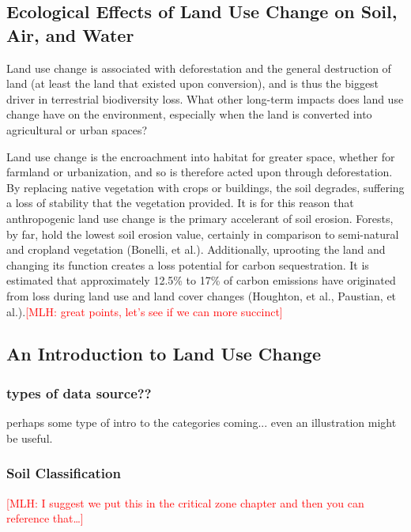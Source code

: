 \documentclass{book}\usepackage{knitr}
\newcommand{\red}[1]{\textcolor{red}{[MLH: #1]}}
\begin{document}
\begin{knitrout}
\begin{kframe}
\section{Ecological Effects of Land Use Change on Soil, Air, and Water}

Land use change is associated with deforestation and the general destruction of land (at least the land that existed upon conversion), and is thus the biggest driver in terrestrial biodiversity loss. What other long-term impacts does land use change have on the environment, especially when the land is converted into agricultural or urban spaces?

Land use change is the encroachment into habitat for greater space, whether for farmland or urbanization, and so is therefore acted upon through deforestation. By replacing native vegetation with crops or buildings, the soil degrades, suffering a loss of stability that the vegetation provided. It is for this reason that anthropogenic land use change is the primary accelerant of soil erosion. Forests, by far, hold the lowest soil erosion value, certainly in comparison to semi-natural and cropland vegetation (Bonelli, et al.). Additionally, uprooting the land and changing its function creates  a loss potential for carbon sequestration. It is estimated that approximately 12.5\% to 17\% of carbon emissions have originated from loss during land use and land cover changes (Houghton, et al., Paustian, et al.).\red{great points, let's see if we can more succinct}

\subsection{An Introduction to Land Use Change}

\subsubsection{types of data source??}

perhaps some type of intro to the categories coming... even an illustration might be useful. 

\subsubsection{Soil Classification}\red{I suggest we put this in the critical zone chapter and then you can reference that\ldots}


\end{kframe}
\end{knitrout}
\end{document}
